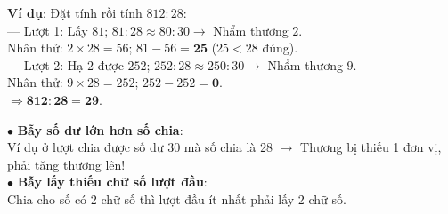 \documentclass[14pt,a4paper,oneside]{extbook}
\begin{document}
\noindent
\begin{minipage}[t]{0.53\textwidth}
  \begin{tcolorbox}[
    enhanced,
    title={\footnotesize\bfseries\color{white}\faCheckCircle\ Ví dụ thực hành chuẩn mực},
    colback=green!2!white,
    colframe=green!60!black,
    arc=2.5mm, boxrule=0.8pt, top=1.8mm, bottom=1.8mm, left=2.2mm, right=2.2mm
  ]
    \footnotesize
    \textbf{Ví dụ}: Đặt tính rồi tính $812 : 28$:\\
    --- Lượt 1: Lấy $81$; $81 : 28 \approx 80 : 30 \rightarrow$ Nhẩm thương $2$.\\
    Nhân thử: $2 \times 28 = 56$; $81 - 56 = \mathbf{25}$ ($25 < 28$ đúng).\\
    --- Lượt 2: Hạ $2$ được $252$; $252 : 28 \approx 250 : 30 \rightarrow$ Nhẩm thương $9$.\\
    Nhân thử: $9 \times 28 = 252$; $252 - 252 = \mathbf{0}$.\\
    $\Rightarrow \mathbf{812 : 28 = 29}$.
  \end{tcolorbox}
\end{minipage}%
\hfill
\begin{minipage}[t]{0.45\textwidth}
  \begin{tcolorbox}[
    enhanced,
    title={\footnotesize\bfseries\color{white}\faExclamationTriangle\ Mẹo tránh bẫy trắc nghiệm},
    colback=red!2!white,
    colframe=red!70!black,
    arc=2.5mm, boxrule=0.8pt, top=1.8mm, bottom=1.8mm, left=2.2mm, right=2.2mm
  ]
    \footnotesize
    $\bullet$ \textbf{Bẫy số dư lớn hơn số chia}:\\
    Ví dụ ở lượt chia được số dư 30 mà số chia là 28 $\rightarrow$ Thương bị thiếu 1 đơn vị, phải tăng thương lên!\\
    $\bullet$ \textbf{Bẫy lấy thiếu chữ số lượt đầu}:\\
    Chia cho số có 2 chữ số thì lượt đầu ít nhất phải lấy 2 chữ số.
  \end{tcolorbox}
\end{minipage}
\end{document}
